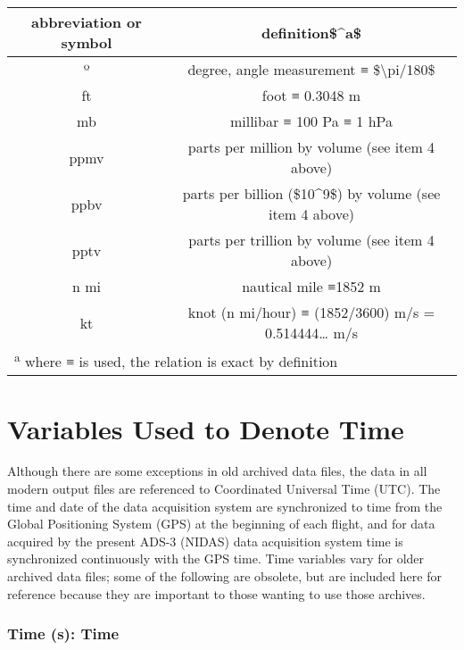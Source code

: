 \documentclass[
  english,
]{book}
\begin{document}
\begin{table}
\centering
\begin{tabular}{c|c}
\hline
abbreviation or symbol & definition\$\textasciicircum{}a\$\\
\hline
º & degree, angle measurement ≡ \$\textbackslash{}pi/180\$\\
\hline
ft & foot ≡ 0.3048 m\\
\hline
mb & millibar ≡ 100 Pa ≡ 1 hPa\\
\hline
ppmv & parts per million by volume (see item 4 above)\\
\hline
ppbv & parts per billion (\$10\textasciicircum{}9\$) by volume (see item 4 above)\\
\hline
pptv & parts per trillion by volume (see item 4 above)\\
\hline
n mi & nautical mile ≡1852 m\\
\hline
kt & knot (n mi/hour) ≡ (1852/3600) m/s = 0.514444… m/s\\
\hline
\multicolumn{2}{l}{\textsuperscript{a} where ≡ is used, the relation is exact by definition}\\
\end{tabular}
\end{table}

\hypertarget{variables-used-to-denote-time}{%
\section{Variables Used to Denote
Time}\label{variables-used-to-denote-time}}

Although there are some exceptions in old archived data files, the data
in all modern output files are referenced to Coordinated Universal Time
(UTC). The time and date of the data acquisition system are synchronized
to time from the Global Positioning System (GPS) at the beginning of
each flight, and for data acquired by the present ADS-3 (NIDAS) data
acquisition system time is synchronized continuously with the GPS time.
Time variables vary for older archived data files; some of the following
are obsolete, but are included here for reference because they are
important to those wanting to use those archives.

\hypertarget{time}{%
\subsubsection*{Time (s): Time}\label{time}}
\end{document}

